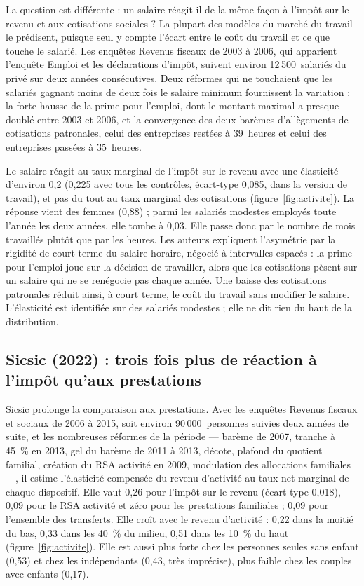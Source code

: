 \documentclass[11pt,a4paper]{article}
\begin{document}
La question est différente : un salaire réagit-il de la même façon à l'impôt sur le revenu et aux
cotisations sociales ? La plupart des modèles du marché du travail le prédisent, puisque seul y
compte l'écart entre le coût du travail et ce que touche le salarié. Les enquêtes Revenus fiscaux de
2003 à 2006, qui apparient l'enquête Emploi et les déclarations d'impôt, suivent environ
12\,500~salariés du privé sur deux années consécutives. Deux réformes qui ne touchaient que les
salariés gagnant moins de deux fois le salaire minimum fournissent la variation : la forte hausse de
la prime pour l'emploi, dont le montant maximal a presque doublé entre 2003 et 2006, et la
convergence des deux barèmes d'allègements de cotisations patronales, celui des entreprises restées
à 39~heures et celui des entreprises passées à 35~heures.

Le salaire réagit au taux marginal de l'impôt sur le revenu avec une élasticité d'environ 0,2
(0,225 avec tous les contrôles, écart-type 0,085, dans la version de travail), et pas du tout au
taux marginal des cotisations (figure~\ref{fig:activite}). La réponse vient des femmes (0,88) ; parmi les salariés modestes
employés toute l'année les deux années, elle tombe à 0,03. Elle passe donc par le nombre de mois
travaillés plutôt que par les heures. Les auteurs expliquent l'asymétrie par la rigidité de court
terme du salaire horaire, négocié à intervalles espacés : la prime pour l'emploi joue sur la décision
de travailler, alors que les cotisations pèsent sur un salaire qui ne se renégocie pas chaque année.
Une baisse des cotisations patronales réduit ainsi, à court terme, le coût du travail sans modifier
le salaire. L'élasticité est identifiée sur des salariés modestes ; elle ne dit rien du haut de la
distribution.

\subsection{Sicsic (2022) : trois fois plus de réaction à l'impôt qu'aux prestations}

Sicsic prolonge la comparaison aux prestations. Avec les enquêtes Revenus fiscaux et sociaux de 2006
à 2015, soit environ 90\,000~personnes suivies deux années de suite, et les nombreuses réformes de la
période --- barème de 2007, tranche à 45~\% en 2013, gel du barème de 2011 à 2013, décote, plafond
du quotient familial, création du RSA activité en 2009, modulation des allocations familiales ---,
il estime l'élasticité compensée du revenu d'activité au taux net marginal de chaque dispositif. Elle
vaut 0,26 pour l'impôt sur le revenu (écart-type 0,018), 0,09 pour le RSA activité et zéro pour les
prestations familiales ; 0,09 pour l'ensemble des transferts. Elle croît avec le revenu
d'activité : 0,22 dans la moitié du bas, 0,33 dans les 40~\% du milieu, 0,51 dans les 10~\% du
haut (figure~\ref{fig:activite}). Elle est aussi plus forte chez les personnes seules
sans enfant (0,53) et chez les indépendants (0,43, très imprécise), plus faible chez les couples avec
enfants (0,17).
\end{document}
